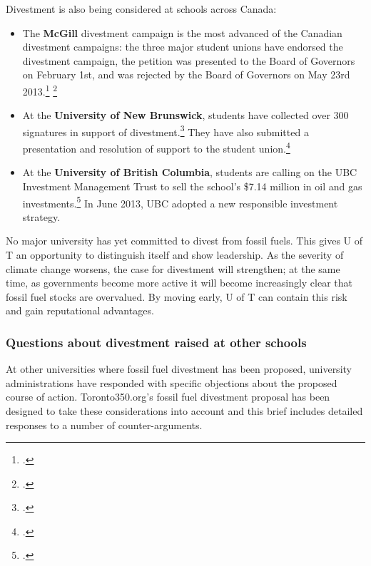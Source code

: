\documentclass[10pt]{article}
\begin{document}
Divestment is also being considered at schools across Canada:
\begin{itemize}
	\item The \textbf{McGill} divestment campaign is the most advanced of the Canadian divestment campaigns: the three major student unions have endorsed the divestment campaign, the petition was presented to the Board of Governors on February 1st, and was rejected by the Board of Governors on May 23rd 2013.\footcite[][]{McGillStudentExecs} \footcite[][]{McGillDelivers}
	\item At the \textbf{University of New Brunswick}, students have collected over 300 signatures in support of divestment.\footcite[][]{UNBPetition} They have also submitted a presentation and resolution of support to the student union.\footcite[][]{UNBStudentUnion}
	\item At the \textbf{University of British Columbia}, students are calling on the UBC Investment Management Trust to sell the school's \$7.14 million in oil and gas investments.\footcite[][]{UBCDivest} In June 2013, UBC adopted a new responsible investment strategy.
\end{itemize}



No major university has yet committed to divest from fossil fuels.
This gives U of T an opportunity to distinguish itself and show leadership.
As the severity of climate change worsens, the case for divestment will strengthen; at the same time, as governments become more active it will become increasingly clear that fossil fuel stocks are overvalued.
By moving early, U of T can contain this risk and gain reputational advantages.



\subsubsection{Questions about divestment raised at other schools}



At other universities where fossil fuel divestment has been proposed, university administrations have responded with specific objections about the proposed course of action.
Toronto350.org's fossil fuel divestment proposal has been designed to take these considerations into account and this brief includes detailed responses to a number of counter-arguments.
\end{document}
